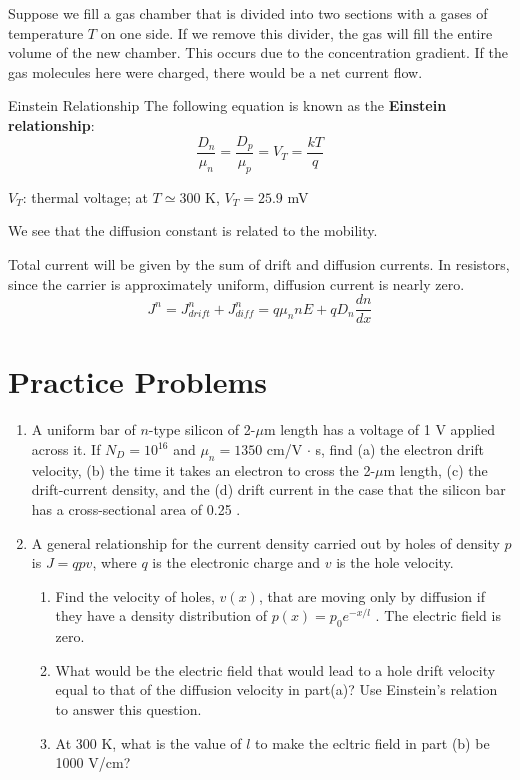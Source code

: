 Suppose we fill a gas chamber that is divided into two sections with a gases of temperature $T$ on one side. If we remove this divider, the gas will fill the entire volume of the new chamber. This occurs due to the concentration gradient. If the gas molecules here were charged, there would be a net current flow.

\begin{Analysis}{Einstein Relationship}{}
    The following equation is known as the \textbf{Einstein relationship}:
        \[\frac{D_n}{\mu_n} = \frac{D_p}{\mu_p} = V_T = \frac{kT}{q}\]
    \begin{gline}
        \item $V_T$: thermal voltage; at $T \simeq 300$ K, $V_T = 25.9$ mV
    \end{gline}
    We see that the diffusion constant is related to the mobility.
\end{Analysis}
Total current will be given by the sum of drift and diffusion currents. In resistors, since the carrier is approximately uniform, diffusion current is nearly zero.
    \[J^n = J_{drift}^n + J_{diff}^n = q\mu_n n E + qD_n \frac{dn}{dx}\]

\section{Practice Problems}
\begin{enumerate}
    \item A uniform bar of $n$-type silicon of 2-$\mu$m length has a voltage of 1 V applied across it. If $N_D = 10^{16}$ \conc and $\mu_n = 1350$ cm\sq/V $\cdot$ s, find (a) the electron drift velocity, (b) the time it takes an electron to cross the 2-$\mu$m length, (c) the drift-current density, and the (d) drift current in the case that the silicon bar has a cross-sectional area of 0.25 \mun\sq.
    \begin{Ans}
    \end{Ans}

    \item A general relationship for the current density carried out by holes of density $p$ is $J = qpv$, where $q$ is the electronic charge and $v$ is the hole velocity.
    \begin{enumerate}
        \item Find the velocity of holes, $v(x)$, that are moving only by diffusion if they have a density distribution of $p(x) = p_0 e^{-x/l}$ . The electric field is zero.
        \item What would be the electric field that would lead to a hole drift velocity equal to that of the diffusion velocity in part(a)? Use Einstein's relation to answer this question.
        \item At 300 K, what is the value of $l$ to make the ecltric field in part (b) be 1000 V/cm?
    \end{enumerate}
\end{enumerate}

